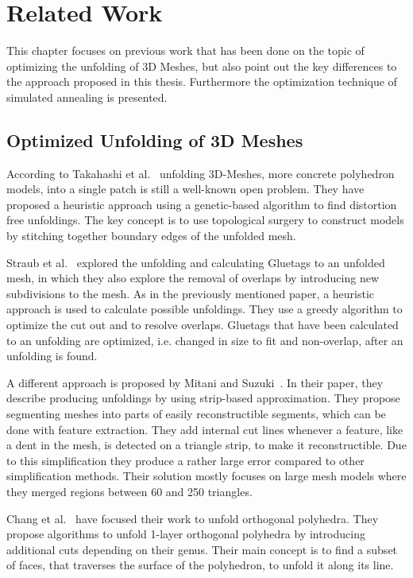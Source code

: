 \documentclass[draft,final]{vutinfth} %
\begin{document}
\chapter{Related Work}
\label{chap:relatedwork}
This chapter focuses on previous work that has been done on the topic of optimizing the unfolding of 3D Meshes, but also point out the key differences to the approach proposed in this thesis. Furthermore the optimization technique of simulated annealing is presented.

\section{Optimized Unfolding of 3D Meshes}


According to Takahashi et al.~\cite{takahashi2011optimized} unfolding 3D-Meshes, more concrete polyhedron models, into a single patch is still a well-known open problem. They have proposed a heuristic approach using a genetic-based algorithm to find distortion free unfoldings. The key concept is to use topological surgery to construct models by stitching together boundary edges of the unfolded mesh.

Straub et al.~\cite{straubcreating} explored the unfolding and calculating Gluetags to an unfolded mesh, in which they also explore the removal of overlaps by introducing new subdivisions to the mesh. As in the previously mentioned paper, a heuristic approach is used to calculate possible unfoldings. They use a greedy algorithm to optimize the cut out and to resolve overlaps. Gluetags that have been calculated to an unfolding are optimized, i.e. changed in size to fit and non-overlap, after an unfolding is found.

A different approach is proposed by Mitani and Suzuki~\cite{mitani2004making}. In their paper, they describe producing unfoldings by using strip-based approximation. They propose segmenting meshes into parts of easily reconstructible segments, which can be done with feature extraction. They add internal cut lines whenever a feature, like a dent in the mesh, is detected on a triangle strip, to make it reconstructible. Due to this simplification they produce a rather large error compared to other simplification methods. Their solution mostly focuses on large mesh models where they merged regions between 60 and 250 triangles.

Chang et al.~\cite{xi2016learning} have focused their work to unfold orthogonal polyhedra. They propose algorithms to unfold 1-layer orthogonal polyhedra by introducing additional cuts depending on their genus. Their main concept is to find a subset of faces, that traverses the surface of the polyhedron, to unfold it along its line. 
\end{document}
